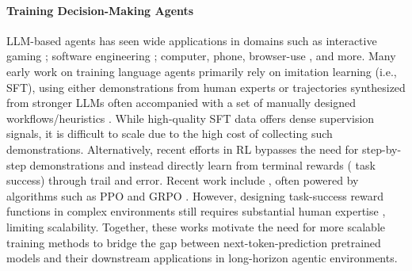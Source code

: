 \paragraph{Training Decision-Making Agents}
LLM-based agents \citep{yao2023reactsynergizingreasoningacting,shinn2023reflexionlanguageagentsverbal} has seen wide applications in domains such as interactive gaming \citep{wang2023voyageropenendedembodiedagent,feng2025groupingrouppolicyoptimizationllm}; software engineering \citep{jimenez2024swebenchlanguagemodelsresolve,yang2024sweagentagentcomputerinterfacesenable}; computer, phone, browser-use \citep{xie2024osworldbenchmarkingmultimodalagents,rawles2025androidworlddynamicbenchmarkingenvironment,zhou2024webarenarealisticwebenvironment,yu2025exactteachingaiagents}, and more.
Many early work on training language agents primarily rely on imitation learning (i.e., SFT), using either demonstrations from human experts \citep{deng2023mind2webgeneralistagentweb,chen2025guicoursegeneralvisionlanguage,wang2025opencuaopenfoundationscomputeruse} or trajectories synthesized from stronger LLMs often accompanied with a set of manually designed workflows/heuristics \citep{zeng2023agenttuningenablinggeneralizedagent,chen2024agentflandesigningdatamethods,su2025learnbyinteractdatacentricframeworkselfadaptive,xu2025aguvisunifiedpurevision}.
While high-quality SFT data offers dense supervision signals, it is difficult to scale due to the high cost of collecting such demonstrations.
Alternatively, recent efforts in RL bypasses the need for step-by-step demonstrations and instead directly learn from terminal rewards (\ie{} task success) through trail and error.
Recent work include \citet{feng2025retoolreinforcementlearningstrategic,rllm2025,luo2025gui,jin2025search,ragen}, often powered by algorithms such as PPO \citep{schulman2017proximalpolicyoptimizationalgorithms} and GRPO \citep{shao2024deepseekmathpushinglimitsmathematical}.
However, designing task-success reward functions in complex environments still requires substantial human expertise \citep{chowdhury2024swebenchverified,xie2024osworldbenchmarkingmultimodalagents,gou2025mind2web2evaluatingagentic}, limiting scalability.
Together, these works motivate the need for more scalable training methods to bridge the gap between next-token-prediction pretrained models and their downstream applications in long-horizon agentic environments.

